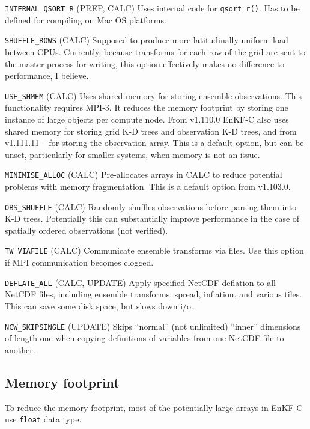 \documentclass[11pt]{report}
\begin{document}
\begin{description}
\item{\verb|INTERNAL_QSORT_R|} (PREP, CALC)
  Uses internal code for \verb|qsort_r()|.
  Has to be defined for compiling on Mac OS platforms.
\item{\verb|SHUFFLE_ROWS|} (CALC)
  Supposed to produce more latitudinally uniform load between CPUs.
  Currently, because transforms for each row of the grid are sent to the master process for writing, this option effectively makes no difference to performance, I believe.
\item{\verb|USE_SHMEM|} (CALC)
  Uses shared memory for storing ensemble observations.
  This functionality requires MPI-3.
  It reduces the memory footprint by storing one instance of large objects per compute node.
  From v1.110.0 EnKF-C also uses shared memory for storing grid K-D trees and observation K-D trees, and from v1.111.11 -- for storing the observation array.
  This is a default option, but can be unset, particularly for smaller systems, when memory is not an issue.
\item{\verb|MINIMISE_ALLOC|} (CALC)
  Pre-allocates arrays in CALC to reduce potential problems with memory fragmentation.
  This is a default option from v1.103.0.
\item{\verb|OBS_SHUFFLE|} (CALC)
  Randomly shuffles observations before parsing them into K-D trees.
  Potentially this can substantially improve performance in the case of spatially ordered observations (not verified).
\item{\verb|TW_VIAFILE|} (CALC)
  Communicate ensemble transforms via files.
  Use this option if MPI communication becomes clogged.
\item{\verb|DEFLATE_ALL|} (CALC, UPDATE)
  Apply specified NetCDF deflation to all NetCDF files, including ensemble transforms, spread, inflation, and various tiles.
  This can save some disk space, but slows down i/o.
\item{\verb|NCW_SKIPSINGLE|} (UPDATE)
  Skips ``normal'' (not unlimited) ``inner'' dimensions of length one when copying definitions of variables from one NetCDF file to another.
\end{description}

\subsection{Memory footprint}
\label{sec:memory}

To reduce the memory footprint, most of the potentially large arrays in EnKF-C use \verb|float| data type.
\end{document}
